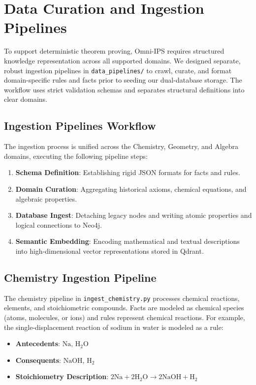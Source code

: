 \section{Data Curation and Ingestion Pipelines}
\label{sec:pipelines}

To support deterministic theorem proving, Omni-IPS requires structured knowledge representation across all supported domains. We designed separate, robust ingestion pipelines in \texttt{data\_pipelines/} to crawl, curate, and format domain-specific rules and facts prior to seeding our dual-database storage. The workflow uses strict validation schemas and separates structural definitions into clear domains.

\subsection{Ingestion Pipelines Workflow}
The ingestion process is unified across the Chemistry, Geometry, and Algebra domains, executing the following pipeline steps:
\begin{enumerate}
    \item \textbf{Schema Definition}: Establishing rigid JSON formats for facts and rules.
    \item \textbf{Domain Curation}: Aggregating historical axioms, chemical equations, and algebraic properties.
    \item \textbf{Database Ingest}: Detaching legacy nodes and writing atomic properties and logical connections to Neo4j.
    \item \textbf{Semantic Embedding}: Encoding mathematical and textual descriptions into high-dimensional vector representations stored in Qdrant.
\end{enumerate}

\subsection{Chemistry Ingestion Pipeline}
The chemistry pipeline in \texttt{ingest\_chemistry.py} processes chemical reactions, elements, and stoichiometric compounds. Facts are modeled as chemical species (atoms, molecules, or ions) and rules represent chemical reactions. 
For example, the single-displacement reaction of sodium in water is modeled as a rule:
\begin{itemize}
    \item \textbf{Antecedents}: $\text{Na}$, $\text{H}_2\text{O}$
    \item \textbf{Consequents}: $\text{NaOH}$, $\text{H}_2$
    \item \textbf{Stoichiometry Description}: $2\text{Na} + 2\text{H}_2\text{O} \to 2\text{NaOH} + \text{H}_2$
\end{itemize}

